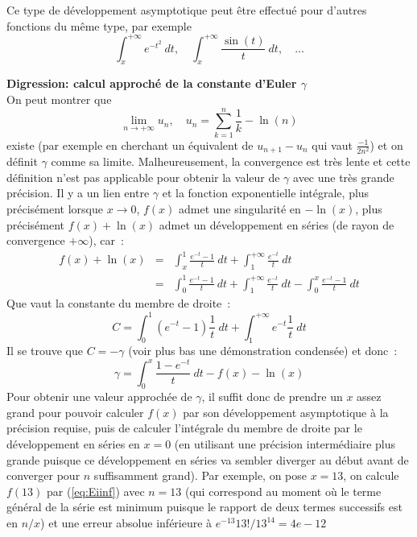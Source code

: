 \documentclass[a4paper,11pt]{article}
\begin{document}
Ce type de d\'eveloppement asymptotique peut \^etre effectu\'e pour
d'autres fonctions du m\^eme type, par exemple
\[ \int_x^{+\infty} e^{-t^2} \ dt, \quad \int_x^{+\infty} \frac{\sin(t)}{t} \ dt, \quad ... \]


{\bf Digression: calcul approché de la constante d'Euler
  $\gamma$}\\
On peut montrer que
\begin{equation} \label{eq:def_gamma}
 \lim_{n\rightarrow +\infty} u_n, \quad u_n=\sum_{k=1}^{n}\frac{1}{k} - \ln(n) 
\end{equation}
existe (par exemple en cherchant un \'equivalent de $u_{n+1}-u_n$ qui vaut 
$\frac{-1}{2n^2}$)
et on définit $\gamma$ comme sa limite. Malheureusement, la convergence
est très lente et cette définition n'est pas applicable pour obtenir la valeur
de $\gamma$ avec une très grande précision.
Il y a un lien entre $\gamma$ et la fonction exponentielle intégrale, plus précisément
lorsque $x\rightarrow 0$, $f(x)$ admet une singularité en $-\ln(x)$,
plus précisément $f(x)+\ln(x)$
admet un développement en séries (de rayon de convergence $+\infty$), car~:
\begin{eqnarray*}
 f(x)+\ln(x)&=&\int_x^{1}\frac{e^{-t}-1}{t} \ dt + \int_1^{+\infty} \frac{e^{-t}}{t} \ dt \\
&=& \int_0^{1}\frac{e^{-t}-1}{t} \ dt + \int_1^{+\infty} \frac{e^{-t}}{t} \ dt
- \int_0^{x} \frac{e^{-t}-1}{t} \ dt
\end{eqnarray*}
Que vaut la constante du membre de droite~:
\[ C=\int_0^{1}(e^{-t}-1)\frac{1}{t} \ dt + \int_1^{+\infty} e^{-t} \frac{1}{t} \ dt \]
Il se trouve que $C=-\gamma$ (voir plus bas une démonstration condensée) et donc~:
\begin{equation} \label{eq:gamma}
 \gamma= \int_0^{x} \frac{1-e^{-t}}{t} \ dt -f(x)-\ln(x)
\end{equation}
Pour obtenir une valeur approchée de $\gamma$, il suffit donc de prendre un $x$ assez grand
pour pouvoir calculer $f(x)$ par son développement asymptotique à la précision requise,
puis de calculer l'intégrale du membre de droite par le développement en séries en $x=0$
(en utilisant une précision intermédiaire plus grande puisque ce développement en séries
va sembler diverger au début avant de converger pour $n$ suffisamment grand).
Par exemple, on pose $x=13$, on calcule $f(13)$ par (\ref{eq:Eiinf})
avec $n=13$ (qui correspond au moment o\`u le terme g\'en\'eral
de la s\'erie est minimum puisque le rapport de deux termes successifs
est en $n/x$)
et une erreur absolue inf\'erieure \`a $e^{-13} 13!/13^{14}=4e-12$
\end{document}
